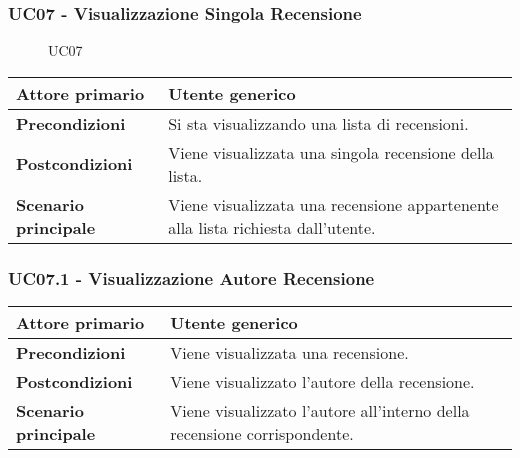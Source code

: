 \subsubsection{UC07 - Visualizzazione Singola Recensione}
\label{UC07}

\begin{figure}[H]
    \centering
    
    \caption{UC07}
 \end{figure}

\begin{center}
\renewcommand{\arraystretch}{1.5}
\begin{tabular}{ | m{10em} | m{20em} | }
    \hline
    \textbf{Attore primario} & Utente generico \\
    \hline
    \textbf{Precondizioni} & Si sta visualizzando una lista di recensioni. \\
    \hline
    \textbf{Postcondizioni} & Viene visualizzata una singola recensione della lista. \\
    \hline
    \textbf{Scenario principale} & Viene visualizzata una recensione appartenente alla lista richiesta dall'utente. \\
    \hline
   \end{tabular}
\end{center}

\subsubsection{UC07.1 - Visualizzazione Autore Recensione}
\label{UC07.1}
\begin{center}
\renewcommand{\arraystretch}{1.5}
\begin{tabular}{ | m{10em} | m{20em} | }
    \hline
    \textbf{Attore primario} & Utente generico \\
    \hline
    \textbf{Precondizioni} & Viene visualizzata una recensione. \\
    \hline
    \textbf{Postcondizioni} & Viene visualizzato l'autore della recensione. \\
    \hline
    \textbf{Scenario principale} & Viene visualizzato l'autore all'interno della recensione corrispondente. \\
    \hline
   \end{tabular}
\end{center}

